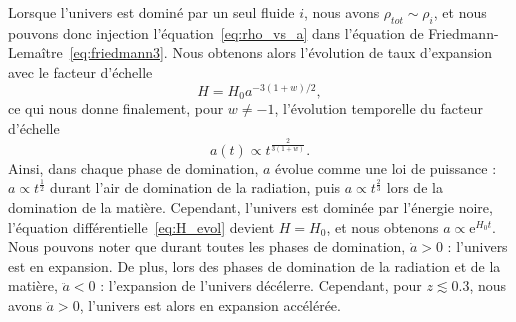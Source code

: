 \documentclass[11pt, twoside, a4paper, openright]{report}
\begin{document}
Lorsque l'univers est dominé par un seul fluide $i$, nous avons $\rho_{tot} \sim \rho_{i}$, et nous pouvons donc injection l'équation~\ref{eq:rho_vs_a} dans l'équation de Friedmann-Lemaître~\ref{eq:friedmann3}. Nous obtenons alors l'évolution de taux d'expansion avec le facteur d'échelle
\begin{equation}
  \label{eq:H_evol}
  H = H_0 a^{-3 (1+w) / 2} ,
\end{equation}
ce qui nous donne finalement, pour $w \neq -1$, l'évolution temporelle du facteur d'échelle
\begin{equation}
  \label{eq:a_vs_t}
  a(t) \propto t^{\frac{2}{3(1+w)}} .
\end{equation}
Ainsi, dans chaque phase de domination, $a$ évolue comme une loi de puissance : $a \propto t^{\frac{1}{2}}$ durant l'air de domination de la radiation, puis $a \propto t^{\frac{2}{3}}$ lors de la domination de la matière. Cependant, l'univers est dominée par l'énergie noire, l'équation différentielle~\ref{eq:H_evol} devient $H = H_0$, et nous obtenons $a \propto \mathrm{e}^{H_{0} t}$. Nous pouvons noter que durant toutes les phases de domination, $\dot a > 0$ : l'univers est en expansion. De plus, lors des phases de domination de la radiation et de la matière, $\ddot a < 0$ : l'expansion de l'univers décélerre. Cependant, pour $ z \lesssim 0.3$, nous avons $\ddot a > 0$, l'univers est alors en expansion accélérée.


\end{document}
